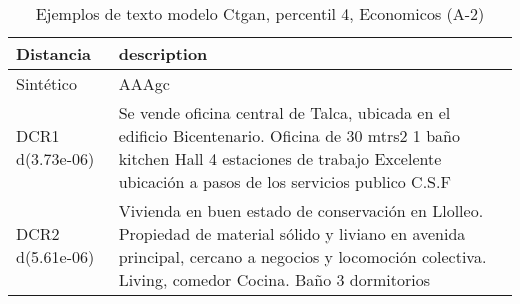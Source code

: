 \begin{table}[H]
\centering
\fontsize{10}{14}\selectfont
\caption{Ejemplos de texto modelo Ctgan, percentil 4, Economicos (A-2)}
\label{table-example-economicos-a-2-ctgan-4p-text}
\begin{tabular}{|l|m{35em}|}
\hline
\rowcolor[gray]{0.8}
Distancia & description \\
\hline Sintético & AAAgc \\
\hline DCR1 d(3.73e-06) & Se vende oficina central de Talca, ubicada en el edificio Bicentenario.  Oficina de 30 mtrs2 1 ba\~no kitchen Hall 4 estaciones de trabajo  Excelente ubicaci\'on a pasos de los servicios publico  C.S.F \\
\hline DCR2 d(5.61e-06) & Vivienda en buen estado de conservaci\'on en Llolleo. Propiedad de material s\'olido y liviano en avenida principal, cercano a negocios y locomoci\'on colectiva.    Living, comedor    Cocina.   Ba\~no   3 dormitorios \\
\hline
\end{tabular}
\end{table}
